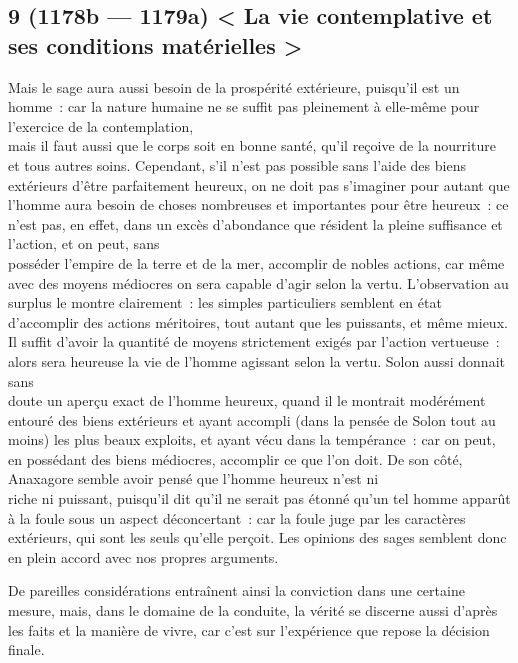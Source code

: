 \documentclass[french,twoside]{book} %
\begin{document}
\subsection[{9 (1178b — 1179a) < La vie contemplative et ses conditions matérielles >}]{9 (1178b — 1179a) < La vie contemplative et ses conditions matérielles >}
\noindent Mais le sage aura aussi besoin de la prospérité extérieure, puisqu’il est un homme : car la nature humaine ne se suffit pas pleinement à elle-même pour l’exercice de la contemplation, \\
mais il faut aussi que le corps soit en bonne santé, qu’il reçoive de la nourriture et tous autres soins. Cependant, s’il n’est pas  possible sans l’aide des biens extérieurs d’être parfaitement heureux, on ne doit pas s’imaginer pour autant que l’homme aura besoin de choses nombreuses et importantes pour être heureux : ce n’est pas, en effet, dans un excès d’abondance que résident la pleine suffisance et l’action, et on peut, sans \\
posséder l’empire de la terre et de la mer, accomplir de nobles actions, car même avec des moyens médiocres on sera capable d’agir selon la vertu. L’observation au surplus le montre clairement : les simples particuliers semblent en état d’accomplir des actions méritoires, tout autant que les puissants, et même mieux. Il suffit d’avoir la quantité de moyens strictement exigés par l’action vertueuse : alors sera heureuse la vie de l’homme agissant selon la vertu. Solon aussi donnait sans \\
doute un aperçu exact de l’homme heureux, quand il le montrait modérément entouré des biens extérieurs et ayant accompli (dans la pensée de Solon tout au moins) les plus beaux exploits, et ayant vécu dans la tempérance : car on peut, en possédant des biens médiocres, accomplir ce que l’on doit. De son côté, Anaxagore semble avoir pensé que l’homme heureux n’est ni \\
riche ni puissant, puisqu’il dit qu’il ne serait pas étonné qu’un tel homme apparût à la foule sous un aspect déconcertant : car la foule juge par les caractères extérieurs, qui sont les seuls qu’elle perçoit. Les opinions des sages semblent donc en plein accord avec nos propres arguments.\par
De pareilles considérations entraînent ainsi la conviction dans une certaine mesure, mais, dans le domaine de la conduite, la vérité se discerne aussi d’après les faits et la manière de vivre, car c’est sur l’expérience que repose la décision finale. \\
\end{document}
